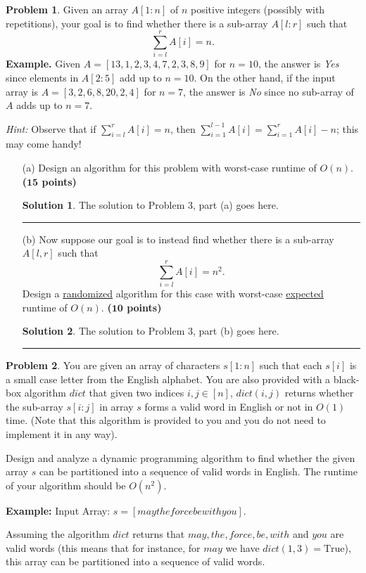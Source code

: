 \documentclass{article}
\theoremstyle{definition}
\newtheorem{problem}{Problem}
\def\fline{\rule{0.75\linewidth}{0.5pt}}
\newcommand{\finishline}{\begin{center}\fline\end{center}}
\newtheorem*{solution*}{Solution}
\newenvironment{solution}{\begin{solution*}}{{\finishline} \end{solution*}}
\newcommand{\grade}[1]{\hfill{\textbf{($\mathbf{#1}$ points)}}}
\begin{document}
\begin{problem}
Given an array $A[1:n]$ of $n$ positive integers (possibly with repetitions), your goal is to find whether there is a sub-array $A[l:r]$ such that
\[
    \sum_{i=l}^r A[i] = n.
\]
\textbf{Example.} Given $A = [13,1,2,3,4,7,2,3,8,9]$ for $n=10$, the answer is \emph{Yes} since elements in $A[2:5]$ add up to $n=10$. 
On the other hand, if the input array is $A = [3,2,6,8,20,2,4]$ for $n=7$, the answer is \emph{No} since no sub-array of $A$ adds up to $n=7$. 

\emph{Hint:} Observe that if $\sum_{i=l}^r A[i] = n$, then $\sum_{i=1}^{l-1} A[i] = \sum_{i=1}^{r} A[i]-n$; this may come handy! 

\begin{enumerate}
\item[(a)] Design an algorithm for this problem with worst-case  runtime of $O(n)$. \grade{15}

\begin{solution}
		The solution to Problem 3, part (a) goes here. 
	\end{solution}
	
	
\item[(b)] Now suppose our goal is to instead find whether there is a sub-array $A[l,r]$ such that 
\[
	\sum_{i=l}^r A[i] = n^2.
\]
Design a \underline{randomized} algorithm for this case with worst-case \underline{expected} runtime of $O(n)$. \grade{10}

\begin{solution}
		The solution to Problem 3, part (b) goes here. 
	\end{solution}
	
	
\end{enumerate}

\end{problem}



\begin{problem}
You are given an array of characters $s[1:n]$ such that each $s[i]$ is a small case letter from the English alphabet. 
You are also provided with a black-box algorithm $dict$ that given two indices $i,j \in [n]$, $dict(i,j)$ returns whether the sub-array $s[i:j]$ in array $s$ forms a valid word in English or not in $O(1)$ time. (Note that this algorithm is provided to you and you 
do not need to implement it in any way). 

Design and analyze a dynamic programming algorithm to find whether the given array $s$ can be partitioned into a sequence of valid words in English. The  runtime of your algorithm should be $O(n^2)$.  


\textbf{Example:} Input Array: $s=[maytheforcebewithyou]$.

Assuming the algorithm $dict$ returns that $may, the, force, be, with$ and  $you$ are valid words (this means that for instance, for $may$ we have $dict(1,3)=\text{True}$), this array can be partitioned into a sequence of valid words.

\end{problem}
\end{document}
